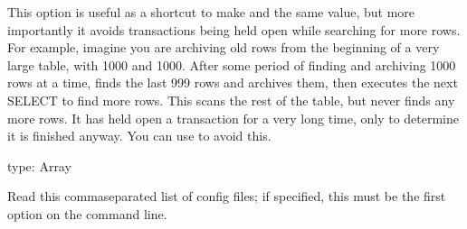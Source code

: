 \documentclass[letterpaper,10pt,english]{sphinxmanual}
\begin{document}
\begin{fulllineitems}
\sphinxAtStartPar
This option is useful as a shortcut to make {\hyperref[\detokenize{mariadb-archiver:cmdoption-mariadb-archiver-limit}]{}} and {\hyperref[\detokenize{mariadb-archiver:cmdoption-mariadb-archiver-txn-size}]{}} the
same value, but more importantly it avoids transactions being held open while
searching for more rows.  For example, imagine you are archiving old rows from
the beginning of a very large table, with {\hyperref[\detokenize{mariadb-archiver:cmdoption-mariadb-archiver-limit}]{}} 1000 and {\hyperref[\detokenize{mariadb-archiver:cmdoption-mariadb-archiver-txn-size}]{}}
1000.  After some period of finding and archiving 1000 rows at a time,
 finds the last 999 rows and archives them, then executes the next
SELECT to find more rows.  This scans the rest of the table, but never finds any
more rows.  It has held open a transaction for a very long time, only to
determine it is finished anyway.  You can use {\hyperref[\detokenize{mariadb-archiver:cmdoption-mariadb-archiver-commit-each}]{}} to avoid this.

\end{fulllineitems}


\begin{fulllineitems}
\label{\detokenize{mariadb-archiver:cmdoption-mariadb-archiver-config}}
\sphinxAtStartPar
type: Array

\sphinxAtStartPar
Read this comma\sphinxhyphen{}separated list of config files; if specified, this must be the
first option on the command line.

\end{fulllineitems}
\end{document}
